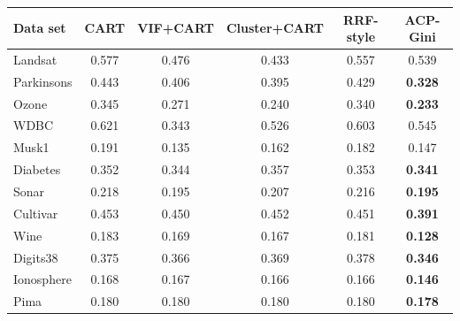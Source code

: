 \begin{tabular}{lccccc}
\toprule
Data set & CART & VIF+CART & Cluster+CART & RRF-style & ACP-Gini \\
\midrule
Landsat & 0.577 & 0.476 & 0.433 & 0.557 & 0.539 \\
Parkinsons & 0.443 & 0.406 & 0.395 & 0.429 & \textbf{0.328} \\
Ozone & 0.345 & 0.271 & 0.240 & 0.340 & \textbf{0.233} \\
WDBC & 0.621 & 0.343 & 0.526 & 0.603 & 0.545 \\
Musk1 & 0.191 & 0.135 & 0.162 & 0.182 & 0.147 \\
Diabetes & 0.352 & 0.344 & 0.357 & 0.353 & \textbf{0.341} \\
Sonar & 0.218 & 0.195 & 0.207 & 0.216 & \textbf{0.195} \\
Cultivar & 0.453 & 0.450 & 0.452 & 0.451 & \textbf{0.391} \\
Wine & 0.183 & 0.169 & 0.167 & 0.181 & \textbf{0.128} \\
Digits38 & 0.375 & 0.366 & 0.369 & 0.378 & \textbf{0.346} \\
Ionosphere & 0.168 & 0.167 & 0.166 & 0.166 & \textbf{0.146} \\
Pima & 0.180 & 0.180 & 0.180 & 0.180 & \textbf{0.178} \\
\bottomrule
\end{tabular}

